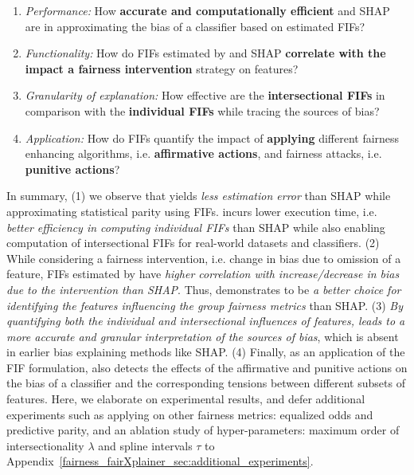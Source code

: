 \setlength{\textfloatsep}{4pt}%
\begin{enumerate}
	\item \textit{Performance:} How \textbf{accurate and computationally efficient} {\fairXplainer} and SHAP are in approximating the bias of a classifier based on estimated FIFs?
	\item \textit{Functionality:} How do FIFs estimated by {\fairXplainer} and SHAP \textbf{correlate with the impact a fairness intervention} strategy on features?
	\item \textit{Granularity of explanation:} How effective are the \textbf{ intersectional FIFs} in comparison with the \textbf{individual FIFs} while tracing the sources of bias?
	\item \textit{Application:} How do FIFs quantify the impact of \textbf{applying} different fairness enhancing algorithms, i.e. \textbf{affirmative actions}, and fairness attacks, i.e. \textbf{punitive actions}?
\end{enumerate}

In summary, (1) we observe that {\fairXplainer} yields \textit{less estimation error} than SHAP while approximating statistical parity using FIFs. {\fairXplainer} incurs lower execution time, i.e. \textit{better efficiency in computing individual FIFs} than SHAP while also enabling computation of intersectional FIFs for real-world datasets and classifiers. (2) While considering a fairness intervention, i.e. change in bias due to omission of a feature, FIFs estimated by {\fairXplainer} have \textit{higher correlation with increase/decrease in bias due to  the intervention than SHAP}. %
Thus, {\fairXplainer} demonstrates to be \textit{a better choice for identifying the features influencing the group fairness metrics} than SHAP. 
(3) \textit{By quantifying both the individual and intersectional influences of features, \fairXplainer{} leads to a more accurate and granular interpretation of the sources of bias}, which is absent in earlier bias explaining methods like SHAP. (4) Finally, as an application of the FIF formulation, {\fairXplainer} also detects the effects of the affirmative and punitive actions on the bias of a classifier and the corresponding tensions between different subsets of features.  Here, we elaborate on experimental results, and defer additional experiments such as applying {\fairXplainer} on other fairness metrics: equalized odds and predictive parity, and an ablation study of hyper-parameters: maximum order of intersectionality  $ \lambda $ and spline intervals $ \tau $ to Appendix~\ref{fairness_fairXplainer_sec:additional_experiments}.

